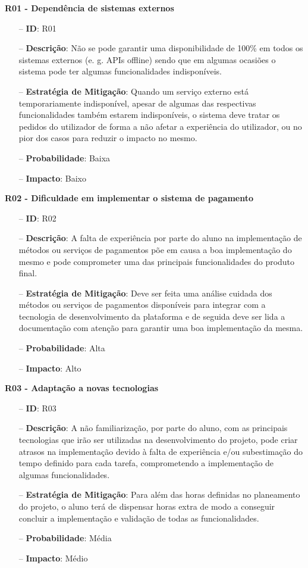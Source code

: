 \textbf{R01 - Dependência de sistemas externos}
\begin{itemize}
	\item[--] \textbf{ID}: R01
	\item[--] \textbf{Descrição}: Não se pode garantir uma disponibilidade de 100\% em todos os sistemas externos (e. g. APIs offline) sendo que em algumas ocasiões o sistema pode ter algumas funcionalidades indisponíveis.
	\item[--] \textbf{Estratégia de Mitigação}: Quando um serviço externo está temporariamente indisponível, apesar de algumas das respectivas funcionalidades também estarem indisponíveis, o sistema deve tratar os pedidos do utilizador de forma a não afetar a experiência do utilizador, ou no pior dos casos para reduzir o impacto no mesmo.
	\item[--] \textbf{Probabilidade}: Baixa
	\item[--] \textbf{Impacto}: Baixo
\end{itemize}

\textbf{R02 - Dificuldade em implementar o sistema de pagamento}
\begin{itemize}
	\item[--] \textbf{ID}: R02
	\item[--] \textbf{Descrição}: A falta de experiência por parte do aluno na implementação de métodos ou serviços de pagamentos põe em causa a boa implementação do mesmo e pode comprometer uma das principais funcionalidades do produto final.
	\item[--] \textbf{Estratégia de Mitigação}: Deve ser feita uma análise cuidada dos métodos ou serviços de pagamentos disponíveis para integrar com a tecnologia de desenvolvimento da plataforma e de seguida deve ser lida a documentação com atenção para garantir uma boa implementação da mesma.
	\item[--] \textbf{Probabilidade}: Alta
	\item[--] \textbf{Impacto}: Alto
\end{itemize}

\textbf{R03 - Adaptação a novas tecnologias }
\begin{itemize}
	\item[--] \textbf{ID}: R03
	\item[--] \textbf{Descrição}: A não familiarização, por parte do aluno, com as principais tecnologias que irão ser utilizadas na desenvolvimento do projeto, pode criar atrasos na implementação devido à falta de experiência e/ou subestimação do tempo definido para cada tarefa, comprometendo a implementação de algumas funcionalidades.
	\item[--] \textbf{Estratégia de Mitigação}: Para além das horas definidas no planeamento do projeto, o aluno terá de dispensar horas extra de modo a conseguir concluir a implementação e validação de todas as funcionalidades.
	\item[--] \textbf{Probabilidade}: Média
	\item[--] \textbf{Impacto}: Médio
\end{itemize}


